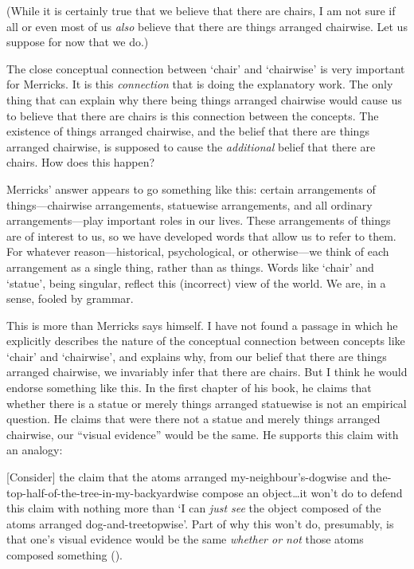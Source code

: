 \documentclass[11pt]{article}
\newenvironment{squote}{%
\begin{spacing}{1}
       	\begin{list}{}{%
\setlength{\labelwidth}{0pt}%
\rightmargin\leftmargin%
}
\item\relax
}{%
\end{list}%
\end{spacing}
}
\begin{document}
\begin{spacing}{1.25}
(While it is certainly true that we believe that there are chairs, I
am not sure if all or even most of us {\em also} believe that there
are things arranged chairwise.  Let us suppose for now that we do.)

The close conceptual connection between `chair' and `chairwise' is
very important for Merricks.  It is this {\em connection} that is
doing the explanatory work.  The only thing that can explain why there
being things arranged chairwise would cause us to believe that there
are chairs is this connection between the concepts.  The existence of
things arranged chairwise, and the belief that there are things
arranged chairwise, is supposed to cause the {\em additional} belief
that there are chairs.  How does this happen?

Merricks' answer appears to go something like this: certain
arrangements of things---chairwise arrangements, statuewise
arrangements, and all ordinary arrangements---play important roles in
our lives.  These arrangements of things are of interest to us, so we
have developed words that allow us to refer to them.  For whatever
reason---historical, psychological, or otherwise---we think of each
arrangement as a single thing, rather than as things.  Words like
`chair' and `statue', being singular, reflect this (incorrect) view of
the world.  We are, in a sense, fooled by grammar.

This is more than Merricks says himself.  I have not found a passage
in which he explicitly describes the nature of the conceptual
connection between concepts like `chair' and `chairwise', and explains
why, from our belief that there are things arranged chairwise, we
invariably infer that there are chairs.  But I think he would endorse
something like this.  In the first chapter of his book, he claims that
whether there is a statue or merely things arranged statuewise is not
an empirical question.  He claims that were there not a statue and
merely things arranged chairwise, our ``visual evidence'' would be the
same.  He supports this claim with an analogy:

\begin{squote}
{[}Consider{]} the claim that the atoms arranged
my-neighbour's-dogwise and the-top-half-of-the-tree-in-my-backyardwise
compose an object\ldots it won't do to defend this claim with nothing
more than `I can \emph{just see} the object composed of the atoms
arranged dog-and-treetopwise'. Part of why this won't do, presumably,
is that one's visual evidence would be the same \emph{whether or not}
those atoms composed something (\citeyear[8--9]{merricks2001a}).
\end{squote}


\end{spacing}
\end{document}
